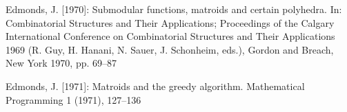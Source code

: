 {\small\setlength{\parindent}{0pt}\setlength{\parskip}{5pt}\sloppy
Edmonds, J. [1970]: Submodular functions, matroids and certain polyhedra. In: Combinatorial Structures and Their Applications; Proceedings of the Calgary International Conference on Combinatorial Structures and Their Applications 1969 (R. Guy, H. Hanani, N. Sauer, J. Schonheim, eds.), Gordon and Breach, New York 1970, pp. 69–87\par
Edmonds, J. [1971]: Matroids and the greedy algorithm. Mathematical Programming 1 (1971), 127–136\par
}
